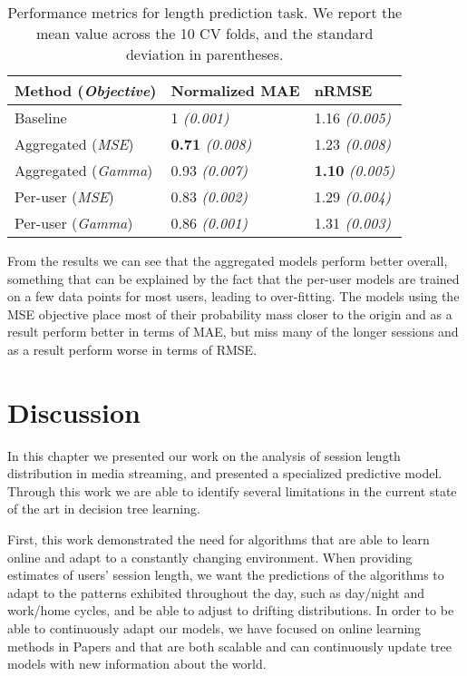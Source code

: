 \begin{table}
	\centering
	\caption{Performance metrics for length prediction task. We report the
		mean value across the 10 CV folds, and the standard deviation in parentheses.}
	\label{tab:session-length-prediction}
	\begin{tabular}{lll}
		\toprule
		Method (\textit{Objective}) & Normalized MAE & nRMSE \\
		\midrule
		Baseline & 1 \textit{(0.001)} & 1.16 \textit{(0.005)} \\
		Aggregated (\textit{MSE}) & \textbf{0.71} \textit{(0.008)} & 1.23 \textit{(0.008)} \\
		Aggregated (\textit{Gamma}) & 0.93 \textit{(0.007)} & \textbf{1.10} \textit{(0.005)} \\
		Per-user (\textit{MSE}) & 0.83 \textit{(0.002)} & 1.29 \textit{(0.004)} \\
		Per-user (\textit{Gamma}) & 0.86 \textit{(0.001)} & 1.31 \textit{(0.003)} \\
		\bottomrule
	\end{tabular}
\end{table}

From the results we can see that the aggregated models perform better overall,
something that can be explained by the fact that the per-user models are trained
on a few data points for most users, leading to over-fitting. The models using the
MSE objective place most of their probability mass closer to the origin and as a
result perform better in terms of MAE, but miss many of the longer sessions
and as a result perform worse in terms of RMSE.

\section{Discussion}
\label{sec:session-length-discussion}

In this chapter we presented our work on the analysis of session
length distribution in media streaming, and presented a specialized
predictive model.
Through this work we are able to identify several limitations in the current
state of the art in decision tree learning.

First, this work demonstrated the need for algorithms that are
able to learn online and adapt to a constantly changing environment. When
providing estimates of users' session length, we want the predictions of
the algorithms to adapt to the patterns exhibited throughout the day,
such as day/night and work/home cycles, and be able to adjust to drifting
distributions.
In order to be able to continuously adapt our models, we have focused on online learning
methods in Papers \uncertaintreesNum and \boostvhtNum that are both scalable and can continuously update tree models with new information about the world.

